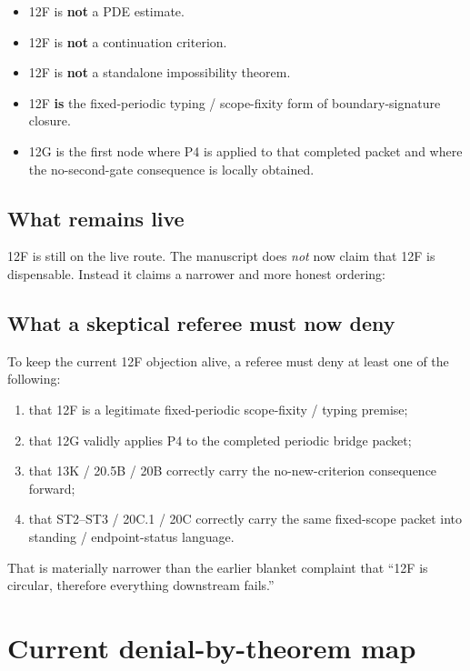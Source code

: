 \documentclass[11pt,letterpaper]{article}
\begin{document}
\begin{itemize}
\item 12F is \textbf{not} a PDE estimate.
\item 12F is \textbf{not} a continuation criterion.
\item 12F is \textbf{not} a standalone impossibility theorem.
\item 12F \textbf{is} the fixed-periodic typing / scope-fixity form of boundary-signature closure.
\item 12G is the first node where P4 is applied to that completed packet and where the no-second-gate consequence is locally obtained.
\end{itemize}

\subsection{What remains live}
12F is still on the live route. The manuscript does \emph{not} now claim that 12F is dispensable. Instead it claims a narrower and more honest ordering:
\begin{center}
\end{center}

\subsection{What a skeptical referee must now deny}
To keep the current 12F objection alive, a referee must deny at least one of the following:
\begin{enumerate}[label=(\alph*),leftmargin=2.2em]
\item that 12F is a legitimate fixed-periodic scope-fixity / typing premise;
\item that 12G validly applies P4 to the completed periodic bridge packet;
\item that 13K / 20.5B / 20B correctly carry the no-new-criterion consequence forward;
\item that ST2--ST3 / 20C.1 / 20C correctly carry the same fixed-scope packet into standing / endpoint-status language.
\end{enumerate}

That is materially narrower than the earlier blanket complaint that ``12F is circular, therefore everything downstream fails.''

\section{Current denial-by-theorem map}
\end{document}
